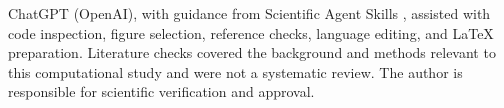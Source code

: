 ChatGPT (OpenAI), with guidance from Scientific Agent Skills \cite{kassis2026}, assisted with code inspection, figure selection, reference checks, language editing, and LaTeX preparation. Literature checks covered the background and methods relevant to this computational study and were not a systematic review. The author is responsible for scientific verification and approval.
